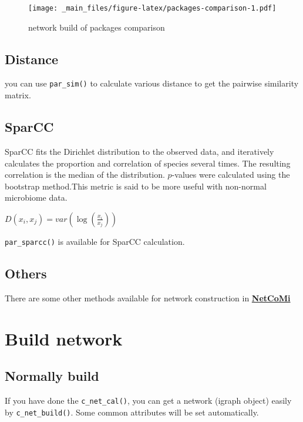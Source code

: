 \documentclass[
]{book}
\begin{document}
\begin{figure}
\centering
\texttt{[image: \_main\_files/figure-latex/packages-comparison-1.pdf]}
\caption{\label{fig:packages-comparison}network build of packages comparison}
\end{figure}

\hypertarget{distance}{%
\subsection{Distance}\label{distance}}

you can use \texttt{par\_sim()} to calculate various distance to get the pairwise similarity matrix.

\hypertarget{sparcc}{%
\subsection{SparCC}\label{sparcc}}

SparCC fits the Dirichlet distribution to the observed data, and iteratively calculates the proportion and correlation of species several times. The resulting correlation is the median of the distribution. \(p\)-values were calculated using the bootstrap method.This metric is said to be more useful with non-normal microbiome data.

\(D(x_i,x_j)=var(\log(\frac{x_i}{x_j}))\)

\texttt{par\_sparcc()} is available for SparCC calculation.

\hypertarget{others}{%
\subsection{Others}\label{others}}

There are some other methods available for network construction in \href{https://github.com/stefpeschel/NetCoMi}{\textbf{NetCoMi}}

\hypertarget{build-network}{%
\section{Build network}\label{build-network}}

\hypertarget{normally-build}{%
\subsection{Normally build}\label{normally-build}}

If you have done the \texttt{c\_net\_cal()}, you can get a network (igraph object) easily by \texttt{c\_net\_build()}. Some common attributes will be set automatically.
\end{document}
